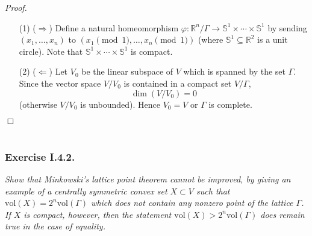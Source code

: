 \documentclass{article}
\begin{document}
\emph{Proof.}
\begin{enumerate}
\item[(1)]
  ($\Longrightarrow$)
  Define a natural homeomorphism
  $\varphi: \mathbb{R}^n/\Gamma \to \mathbb{S}^1 \times \cdots \times \mathbb{S}^1$
  by sending $(x_1, \ldots, x_n)$ to $(x_1 \pmod{1}, \ldots, x_n \pmod{1})$
  (where $\mathbb{S}^1 \subseteq \mathbb{R}^2$ is a unit circle).
  Note that $\mathbb{S}^1 \times \cdots \times \mathbb{S}^1$ is compact.

\item[(2)]
  ($\Longleftarrow$)
  Let $V_0$ be the linear subspace of $V$ which is spanned by the set $\Gamma$.
  Since the vector space $V/V_0$ is contained in a compact set $V/\Gamma$,
  \[
    \dim(V/V_0) = 0
  \]
  (otherwise $V/V_0$ is unbounded).
  Hence $V_0 = V$ or $\Gamma$ is complete.
\end{enumerate}
$\Box$ \\\\






\subsubsection*{Exercise I.4.2.}
\emph{Show that Minkowski's lattice point theorem cannot be improved,
by giving an example of a centrally symmetric convex set $X \subset V$ such that
$\mathrm{vol}(X) = 2^n \mathrm{vol}(\Gamma)$
which does not contain any nonzero point of the lattice $\Gamma$.
If $X$ is compact, however,
then the statement $\mathrm{vol}(X) > 2^n \mathrm{vol}(\Gamma)$ does remain true
in the case of equality.} \\
\end{document}
